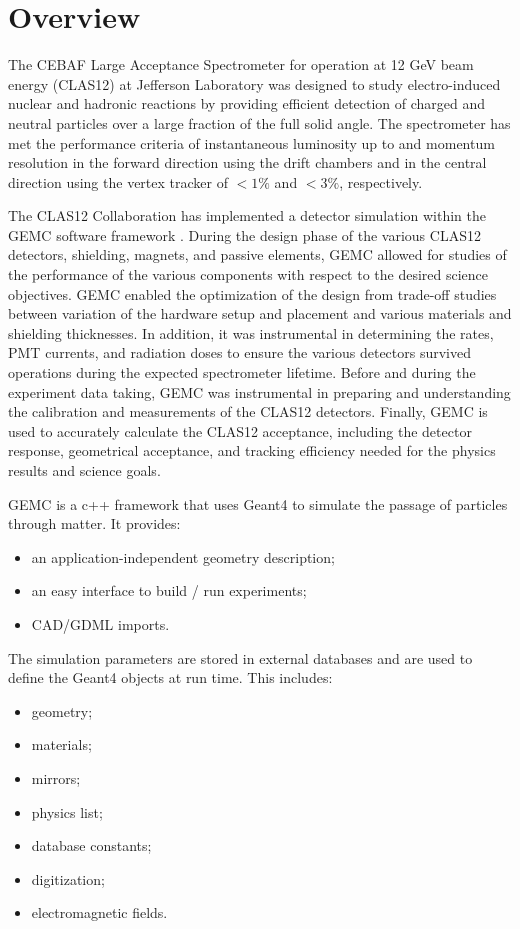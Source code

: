 \section{Overview}

The CEBAF Large Acceptance Spectrometer for operation at 12 GeV beam energy (CLAS12) \cite{clas12-nim}  at Jefferson Laboratory was designed to study
electro-induced nuclear and hadronic reactions by providing efficient detection of charged and neutral particles over a large
fraction of the full solid angle. The spectrometer has met the performance criteria of instantaneous luminosity up
to \cLuminosity and momentum resolution in the forward direction using the drift chambers and in the central
direction using the vertex tracker of $< 1\%$ and $< 3\%$, respectively.

The CLAS12 Collaboration has implemented a detector simulation within the GEMC software framework \cite{GEMC}.
During the design phase of the various CLAS12 detectors, shielding, magnets, and passive elements, GEMC allowed for studies of the
performance of the various components with respect to the desired science objectives.
GEMC enabled the optimization of the design from trade-off studies between variation of the hardware setup and placement
and various materials and shielding thicknesses.
In addition, it was instrumental in determining the rates, PMT currents, and radiation doses to ensure the various detectors
survived operations during the expected spectrometer lifetime.
Before and during the experiment data taking, GEMC was instrumental in preparing and understanding the calibration
and measurements of the CLAS12 detectors.
Finally, GEMC is used to accurately calculate the CLAS12 acceptance, including the detector response, geometrical acceptance,
and tracking efficiency needed for the physics results and science goals.


GEMC is a c++ framework that uses Geant4 \cite{geant4} to simulate the passage of particles through matter. It provides:
\begin{itemize}
	\item an application-independent geometry description;
	\item an easy interface to build / run experiments;
	\item CAD/GDML imports.
\end{itemize}

The simulation parameters are stored in external databases and are used to define the Geant4 objects at run time. This includes:
\begin{itemize}
	\item geometry;
	\item materials;
	\item mirrors;
	\item physics list;
	\item database constants;
	\item digitization;
	\item electromagnetic fields.
\end{itemize}

